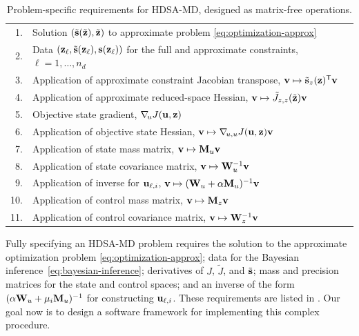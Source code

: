 \begin{table}[t]
\centering
\begin{tabular}{|rl|} %
    \hline
    1. & Solution $(\tilde{\mathbf{s}}(\tilde{\mathbf{z}}),\tilde{\mathbf{z}})$ to approximate problem \cref{eq:optimization-approx}
    \\
    2. & Data $(\mathbf{z}_{\ell},\tilde{\mathbf{s}}(\mathbf{z}_{\ell}),\mathbf{s}(\mathbf{z}_{\ell}))$ for the full and approximate constraints, $\ell=1,\ldots,n_d$
    \\ %
    3. & Application of approximate constraint Jacobian transpose, $\mathbf{v}\mapsto\tilde{\mathbf{s}}_{z}(\mathbf{z})^{\mathsf{T}}\mathbf{v}$ %
    \\
    4. & Application of approximate reduced-space Hessian, $\mathbf{v}\mapsto\tilde{J}_{z,z}(\tilde{\mathbf{z}})\mathbf{v}$ %
    \\
    5. & Objective state gradient, $\nabla_{\!u}J(\mathbf{u},\mathbf{z})$ %
    \\
    6. & Application of objective state Hessian, $\mathbf{v}\mapsto\nabla_{\!u,u}J(\mathbf{u},\mathbf{z})\mathbf{v}$ %
    \\ %
    7. & Application of state mass matrix, $\mathbf{v}\mapsto\mathbf{M}_u\mathbf{v}$ %
    \\
    8. & Application of state covariance matrix, $\mathbf{v}\mapsto\mathbf{W}_u^{-1}\mathbf{v}$ %
    \\
    9. & Application of inverse for $\mathbf{u}_{\ell,i}$, $\mathbf{v}\mapsto(\mathbf{W}_u + \alpha\mathbf{M}_u)^{-1}\mathbf{v}$ %
    \\ %
    10. & Application of control mass matrix, $\mathbf{v}\mapsto\mathbf{M}_z\mathbf{v}$ %
    \\
    11. & Application of control covariance matrix, $\mathbf{v}\mapsto\mathbf{W}_z^{-1}\mathbf{v}$ %
    \\ \hline
\end{tabular}
\caption{Problem-specific requirements for HDSA-MD, designed as matrix-free operations.}
\label{table:hdsa-requirements}
\end{table}

Fully specifying an HDSA-MD problem requires the solution to the approximate optimization problem \cref{eq:optimization-approx}; data for the Bayesian inference~\cref{eq:bayesian-inference}; derivatives of $J$, $\tilde{J}$, and $\tilde{\mathbf{s}}$; mass and precision matrices for the state and control spaces; and an inverse of the form $(\alpha\mathbf{W}_u + \mu_i\mathbf{M}_u)^{-1}$ for constructing $\mathbf{u}_{\ell,i}$.
These requirements are listed in .
Our goal now is to design a software framework for implementing this complex procedure.

